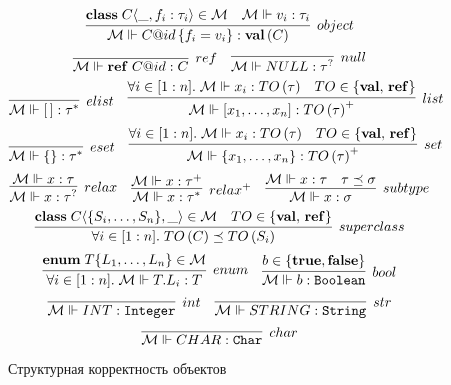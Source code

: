 \newcommand{\fromMM}{\MM{M} \Vdash}
\begin{figure}[htbp]
	\centering
$$
	\infer[object]{
		\fromMM \obj{C}{id}{f_i = v_i} : \valt{C}
	}{
		\classf{C}{\_}{f_i : \tau_i} \in \MM{M}&
		\fromMM v_i : \tau_i
	}
$$
$$
\infer[ref]{
	\fromMM \refv{C}{id} : C
}{}
\quad
\infer[null]{
	\fromMM NULL : \tau^?
}{}
$$
$$
\infer[elist]{
	\fromMM [\,] : \tau^*
}{}
\quad
\infer[list]{
	\fromMM [x_1, \ldots, x_n] : \type{TO}{\tau}^+
}{
	\forall i\in[1:n]. \; \fromMM x_i : \type{TO}{\tau} &
	TO \in \{\valts,\, \refts\}
}
$$
$$
\infer[eset]{
	\fromMM \{\} : \tau^*
}{}
\quad
\infer[set]{
	\fromMM \{x_1, \ldots, x_n\} : \type{TO}{\tau}^+
}{
	\forall i\in[1:n]. \; \fromMM x_i : \type{TO}{\tau} &
	TO \in \{\valts,\, \refts\}
}
$$
$$
\infer[relax]{
	\fromMM x : \tau^?
}{
	\fromMM x : \tau
}
\quad
\infer[relax^+]{
	\fromMM x : \tau^*
}{
	\fromMM x : \tau^+
}
\quad
\infer[subtype]{
	\fromMM x : \sigma
}{
	\fromMM x : \tau &
	\tau \subtype \sigma
}
$$
$$
\infer[superclass]{
	\forall i \in [1:n].\; \type{TO}{C} \subtype \type{TO}{S_i}
}{
	\classf{C}{\{S_i, \ldots, S_n\}}{\_} \in \MM{M} &
	TO \in \{\valts,\, \refts\}
}
$$
$$
\infer[enum]{
	\forall i \in [1:n]. \; \fromMM T.L_i : T
}{
	\mathbf{enum}\;T\{L_1,\ldots,L_n\} \in \MM{M}
}
\quad
\infer[bool]{
	\fromMM b : \mathtt{Boolean}
}{
	b \in \{\mathbf{true}, \mathbf{false}\}
}
$$
$$
\infer[int]{\fromMM INT : \mathtt{Integer}}{}
\quad
\infer[str]{\fromMM STRING : \mathtt{String}}{}
$$
$$
\infer[char]{\fromMM CHAR : \mathtt{Char}}{}
$$
	\caption{Структурная корректность объектов}\label{TypesMM}
\end{figure}

